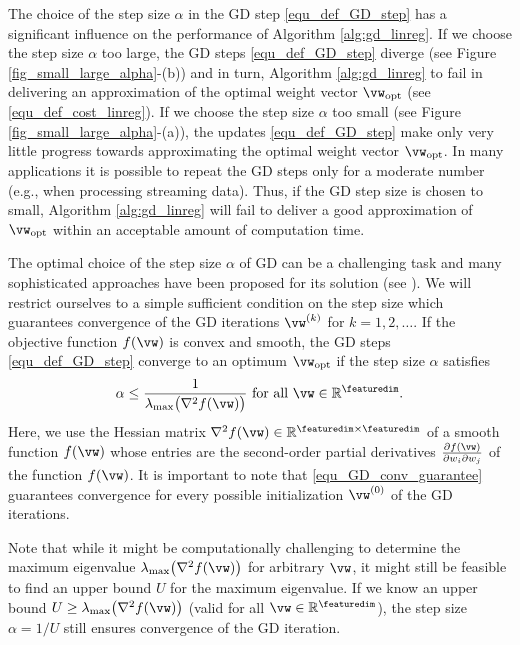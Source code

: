 \documentclass[12pt]{report}
\begin{document}
The choice of the step size $\alpha$ in the GD step \eqref{equ_def_GD_step} has a significant influence on the performance of 
Algorithm \ref{alg:gd_linreg}. If we choose the step size $\alpha$ too large, the GD steps \eqref{equ_def_GD_step} diverge 
(see Figure \ref{fig_small_large_alpha}-(b)) and in turn, Algorithm \ref{alg:gd_linreg} to fail in delivering an approximation of 
the optimal weight vector $\vw_{\rm opt}$ (see \eqref{equ_def_cost_linreg}). If we choose the step size $\alpha$ too small 
(see Figure \ref{fig_small_large_alpha}-(a)), the updates \eqref{equ_def_GD_step} make only very little progress towards 
approximating the optimal weight vector $\vw_{\rm opt}$. In many applications it is possible to repeat the GD steps only for 
a moderate number (e.g., when processing streaming data). Thus, if the GD step size is chosen to small, Algorithm \ref{alg:gd_linreg} 
will fail to deliver a good approximation of $\vw_{\rm opt}$ within an acceptable amount of computation time. 

The optimal choice of the step size $\alpha$ of GD can be a challenging task and many sophisticated approaches 
have been proposed for its solution (see \cite[Chapter 8]{Goodfellow-et-al-2016}). We will restrict ourselves to a simple sufficient 
condition on the step size which guarantees convergence of the GD iterations $\vw^{(k)}$ for $k=1,2,\ldots$. 
If the objective function $f(\vw)$ is convex and smooth, the GD steps \eqref{equ_def_GD_step} converge 
to an optimum $\vw_{\rm opt}$ if the step size $\alpha$ satisfies \cite{nestrov04}
\begin{equation} 
\label{equ_GD_conv_guarantee}
\alpha \leq \frac{1}{\lambda_{\rm max} \big( \nabla^{2} f(\vw) \big) }\mbox{ for all } \vw \in \mathbb{R}^{\featuredim}. 
\end{equation} 
Here, we use the Hessian matrix $ \nabla^{2} f(\vw) \in \mathbb{R}^{\featuredim \times \featuredim}$ of a smooth function $f(\vw)$ 
whose entries are the second-order partial derivatives $\frac{\partial f(\vw)}{\partial w_{i} \partial w_{j}}$ of the function $f(\vw)$. 
It is important to note that \eqref{equ_GD_conv_guarantee} guarantees convergence for every possible initialization $\vw^{(0)}$ 
of the GD iterations. 

Note that while it might be computationally challenging to determine the maximum eigenvalue 
$\lambda_{\rm max} \big( \nabla^{2} f(\vw) \big)$ for arbitrary $\vw$, it might still be feasible to find an 
upper bound $U$ for the maximum eigenvalue. If we know an upper bound $U \geq \lambda_{\rm max} \big( \nabla^{2} f(\vw) \big)$ (valid for all $\vw \in \mathbb{R}^{\featuredim}$), 
the step size $\alpha =1/U$ still ensures convergence of the GD iteration.
\end{document}
